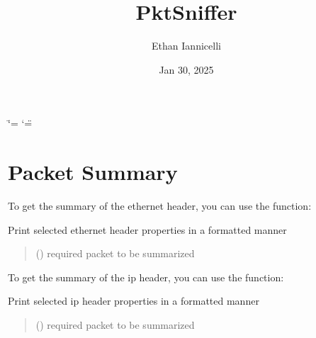 \documentclass[letterpaper,10pt,english,openany,oneside]{sphinxmanual}
\title{PktSniffer}
\date{Jan 30, 2025}
\author{Ethan Iannicelli}
\begin{document}
\ifdefined\shorthandoff
  \ifnum\catcode`\=\string=\active\shorthandoff{=}\fi
  \ifnum\catcode`\"=\active{}\fi
\fi

\pagestyle{empty}
\sphinxmaketitle
\pagestyle{plain}
\sphinxtableofcontents
\pagestyle{normal}
\label{\detokenize{index::doc}}



\chapter{Packet Summary}
\label{\detokenize{index:packet-summary}}
\sphinxAtStartPar
To get the summary of the ethernet header, you can
use the  function:

\begin{fulllineitems}
\label{\detokenize{index:pktsniffer.get_eth_summary}}
\pysigstartsignatures
\pysiglinewithargsret
{}
{}
{}
\pysigstopsignatures
\sphinxAtStartPar
Print selected ethernet header properties in a formatted manner
\begin{quote}\begin{description}
\sphinxAtStartPar
{} () \textendash{} required packet to be summarized

\end{description}\end{quote}

\end{fulllineitems}


\sphinxAtStartPar
To get the summary of the ip header, you can
use the  function:

\begin{fulllineitems}
\label{\detokenize{index:pktsniffer.get_ip_summary}}
\pysigstartsignatures
\pysiglinewithargsret
{}
{}
{}
\pysigstopsignatures
\sphinxAtStartPar
Print selected ip header properties in a formatted manner
\begin{quote}\begin{description}
\sphinxAtStartPar
{} () \textendash{} required packet to be summarized

\end{description}\end{quote}

\end{fulllineitems}
\end{document}
